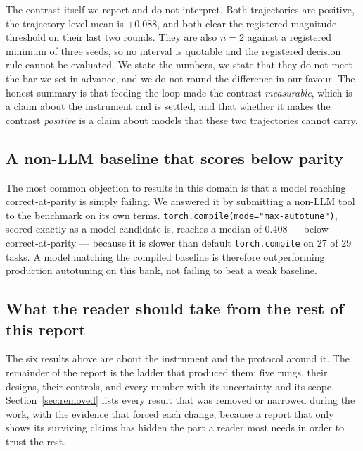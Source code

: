 The contrast itself we report and do not interpret. Both trajectories are positive, the
trajectory-level mean is $+0.088$, and both clear the registered magnitude threshold on their last
two rounds. They are also $n=2$ against a registered minimum of three seeds, so no interval is
quotable and the registered decision rule cannot be evaluated. We state the numbers, we state that
they do not meet the bar we set in advance, and we do not round the difference in our favour. The
honest summary is that feeding the loop made the contrast \emph{measurable}, which is a claim about
the instrument and is settled, and that whether it makes the contrast \emph{positive} is a claim
about models that these two trajectories cannot carry.

\subsection{A non-LLM baseline that scores below parity}

The most common objection to results in this domain is that a model reaching correct-at-parity is
simply failing. We answered it by submitting a non-LLM tool to the benchmark on its own terms.
\texttt{torch.compile(mode="max-autotune")}, scored exactly as a model candidate is, reaches a
median of $0.408$ --- below correct-at-parity --- because it is slower than default
\texttt{torch.compile} on 27 of 29 tasks. A model matching the compiled baseline is therefore
outperforming production autotuning on this bank, not failing to beat a weak baseline.

\subsection{What the reader should take from the rest of this report}

The six results above are about the instrument and the protocol around it. The remainder of the report is the ladder that
produced them: five rungs, their designs, their controls, and every number with its uncertainty
and its scope. Section~\ref{sec:removed} lists every result that was removed or narrowed during
the work, with the evidence that forced each change, because a report that only shows its
surviving claims has hidden the part a reader most needs in order to trust the rest.
